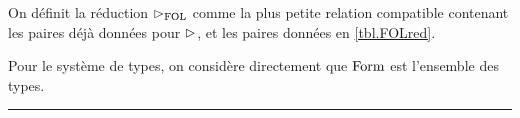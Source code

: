 \begin{definition}
  On définit la réduction $\FOLred$ comme la plus petite relation compatible
  contenant les paires déjà données pour $\rhd$, et les paires données
  en \cref{tbl.FOLred}.
  \index[notation]{$\FOLred$}
\end{definition}

Pour le système de types, on considère directement que $\operatorname{Form}$ est l'ensemble
des types.

\begin{table}[t]
  \centering

  \vspace{0.2cm}
  \hrule

  \vspace{0.2cm}
  \caption{Règles de typage pour $\FOLSet$}
  \label{tbl.FOLTy}
\end{table}

